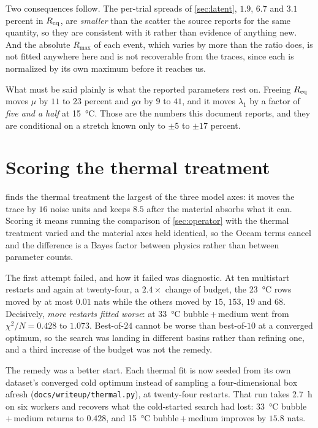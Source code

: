 \documentclass[10pt]{article}
\begin{document}
Two consequences follow. The per-trial spreads of \cref{sec:latent}, $1.9$, $6.7$ and $3.1$
percent in $R_{\rm eq}$, are \emph{smaller} than the scatter the source reports for the same
quantity, so they are consistent with it rather than evidence of anything new. And the absolute
$R_{\max}$ of each event, which varies by more than the ratio does, is not fitted anywhere here
and is not recoverable from the traces, since each is normalized by its own maximum before it
reaches us.

What must be said plainly is what the reported parameters rest on. Freeing $R_{\rm eq}$ moves
$\mu$ by $11$ to $23$ percent and $g\alpha$ by $9$ to $41$, and it moves $\lambda_1$ by a factor
of \emph{five and a half} at \SI{15}{\celsius}. Those are the numbers this document reports, and
they are conditional on a stretch known only to $\pm 5$ to $\pm 17$ percent.

\section{Scoring the thermal treatment}
\label{sec:thermal}

 finds the thermal treatment the largest of the three model axes: it moves the
trace by $16$ noise units and keeps $8.5$ after the material absorbs what it can. Scoring it
means running the comparison of \cref{sec:operator} with the thermal treatment varied and the
material axes held identical, so the Occam terms cancel and the difference is a Bayes factor
between physics rather than between parameter counts.

The first attempt failed, and how it failed was diagnostic. At ten multistart restarts and
again at twenty-four, a $2.4\times$ change of budget, the \SI{23}{\celsius} rows moved by
at most $0.01$ nats while the others moved by $15$, $153$, $19$ and $68$. Decisively,
\emph{more restarts fitted worse}: at \SI{33}{\celsius} bubble\,+\,medium went from
$\chi^2/N = 0.428$ to $1.073$. Best-of-$24$ cannot be worse than best-of-$10$ at a converged
optimum, so the search was landing in different basins rather than refining one, and a third
increase of the budget was not the remedy.

The remedy was a better start. Each thermal fit is now seeded from its own dataset's converged
cold optimum instead of sampling a four-dimensional box afresh (\texttt{docs/writeup/thermal.py}), at
twenty-four restarts. That run takes \SI{2.7}{\hour} on six workers and recovers what the
cold-started search had lost: \SI{33}{\celsius} bubble\,+\,medium returns to $0.428$, and
\SI{15}{\celsius} bubble\,+\,medium improves by $15.8$ nats.
\end{document}
